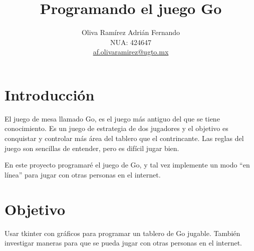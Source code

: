 \documentclass[10pt,letterpaper]{article}
\title{Programando el juego Go}
\author{Oliva Ramírez Adrián Fernando \\ NUA: 424647 \\ \href{mailto:af.olivaramirez@ugto.mx}{af.olivaramirez@ugto.mx}}
\theoremstyle{definition}
\begin{document}
\maketitle

\section{Introducci\'on}

El juego de mesa llamado Go, es el juego m\'as antiguo del que se tiene conocimiento. Es un juego de estrategia de dos jugadores y el objetivo es conquistar y controlar m\'as \'area del tablero que el contrincante. Las reglas del juego son sencillas de entender, pero es dif\'icil jugar bien.

En este proyecto programar\'e el juego de Go, y tal vez implemente un modo ``en l\'inea'' para jugar con otras personas en el internet.

\section{Objetivo}

Usar tkinter con gr\'aficos para programar un tablero de Go jugable. Tambi\'en investigar maneras para que se pueda jugar con otras personas en el internet.
\end{document}
